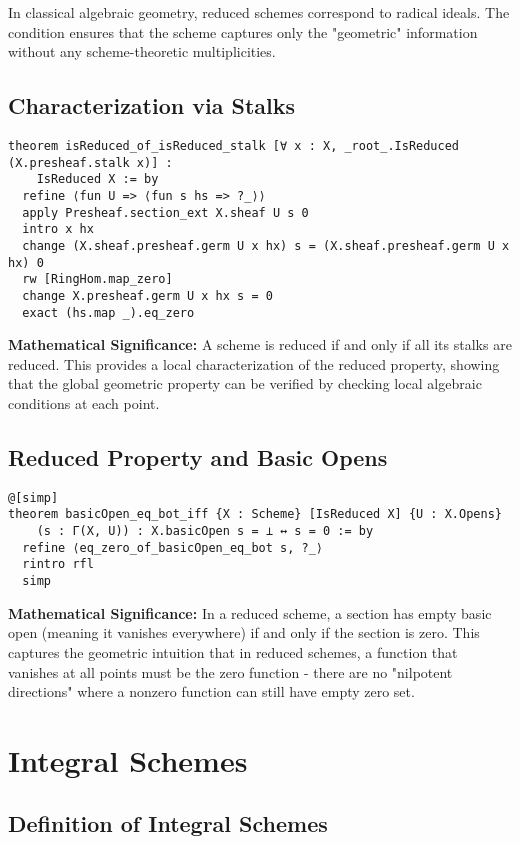 \documentclass{article}
\theoremstyle{definition}
\begin{document}
In classical algebraic geometry, reduced schemes correspond to radical ideals. The condition ensures that the scheme captures only the "geometric" information without any scheme-theoretic multiplicities.

\subsection{Characterization via Stalks}

\begin{lstlisting}
theorem isReduced_of_isReduced_stalk [∀ x : X, _root_.IsReduced (X.presheaf.stalk x)] :
    IsReduced X := by
  refine ⟨fun U => ⟨fun s hs => ?_⟩⟩
  apply Presheaf.section_ext X.sheaf U s 0
  intro x hx
  change (X.sheaf.presheaf.germ U x hx) s = (X.sheaf.presheaf.germ U x hx) 0
  rw [RingHom.map_zero]
  change X.presheaf.germ U x hx s = 0
  exact (hs.map _).eq_zero
\end{lstlisting}

\textbf{Mathematical Significance:} A scheme is reduced if and only if all its stalks are reduced. This provides a local characterization of the reduced property, showing that the global geometric property can be verified by checking local algebraic conditions at each point.

\subsection{Reduced Property and Basic Opens}

\begin{lstlisting}
@[simp]
theorem basicOpen_eq_bot_iff {X : Scheme} [IsReduced X] {U : X.Opens}
    (s : Γ(X, U)) : X.basicOpen s = ⊥ ↔ s = 0 := by
  refine ⟨eq_zero_of_basicOpen_eq_bot s, ?_⟩
  rintro rfl
  simp
\end{lstlisting}

\textbf{Mathematical Significance:} In a reduced scheme, a section has empty basic open (meaning it vanishes everywhere) if and only if the section is zero. This captures the geometric intuition that in reduced schemes, a function that vanishes at all points must be the zero function - there are no "nilpotent directions" where a nonzero function can still have empty zero set.

\section{Integral Schemes}

\subsection{Definition of Integral Schemes}
\end{document}
